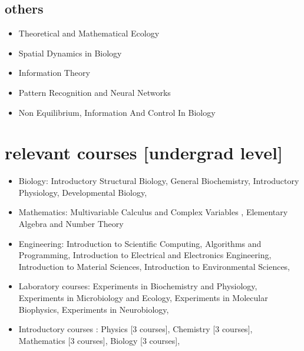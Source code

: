 \documentclass[11pt,print]{friggeri-cv}%
\begin{document}
\begin{multicols}{2}[]
\begin{minipage}{1.05\columnwidth}
\subsection{others}
\begin{itemize}
\item Theoretical and Mathematical Ecology
\item Spatial Dynamics in Biology
\item Information Theory
\item Pattern Recognition and Neural Networks
\item Non Equilibrium, Information And Control In Biology
\end{itemize}


\end{minipage}

\end{multicols}

\section{relevant courses [undergrad level]}

\begin{itemize}




\item Biology:
Introductory Structural Biology,
General Biochemistry,
Introductory Physiology,
Developmental Biology,



\item Mathematics:
Multivariable Calculus and Complex Variables , 
Elementary Algebra and Number Theory



\item Engineering:
Introduction to Scientific Computing,
Algorithms and Programming,
Introduction to Electrical and Electronics Engineering,
Introduction to Material Sciences,
Introduction to Environmental Sciences,


\item Laboratory courses:
 Experiments in Biochemistry and Physiology,
 Experiments in Microbiology and Ecology,
 Experiments in Molecular Biophysics,
 Experiments in Neurobiology,

\item  Introductory courses : 
 Physics {\small[3 courses]},
 Chemistry {\small[3 courses]},
 Mathematics {\small[3 courses]},
 Biology {\small[3 courses]},



\end{itemize}
\end{document}
